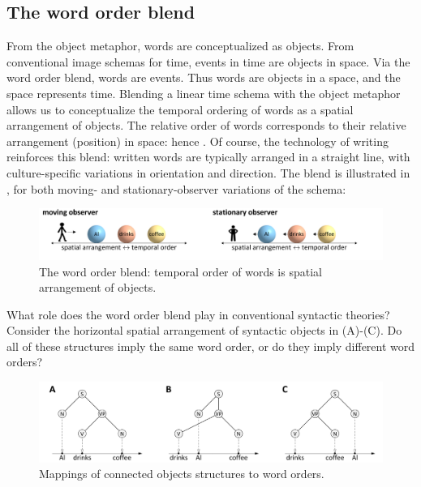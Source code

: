 \subsection{The word order blend}

From the object metaphor, words are conceptualized as objects. From conventional image schemas for time, events in time are objects in space. Via the word order blend, words are events. Thus words are objects in a space, and the space represents time. Blending a linear time schema with the object metaphor allows us to conceptualize the temporal ordering of words as a spatial arrangement of objects. The relative order of words corresponds to their relative arrangement (position) in space: hence {}. Of course, the technology of writing reinforces this blend: written words are typically arranged in a straight line, with culture-specific variations in orientation and direction. The blend is illustrated in {}, for both moving- and stationary-observer variations of the schema:

  
\begin{figure}
\includegraphics[width=\textwidth]{figures/Tilsen-img39.png}
\caption{The word order blend: temporal order of words is spatial arrangement of objects.}
\label{fig:3:11}
\end{figure}
 

  What role does the word order blend play in conventional syntactic theories? Consider the horizontal spatial arrangement of syntactic objects in {}(A)-(C). Do all of these structures imply the same word order, or do they imply different word orders?

  
\begin{figure}
\includegraphics[width=\textwidth]{figures/Tilsen-img40.png}
\caption{Mappings of connected objects structures to word orders.}
\label{fig:3:12}
\end{figure}
 


